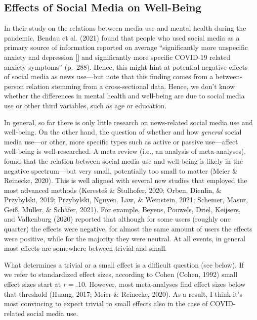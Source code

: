 \documentclass[
  english,
  man,floatsintext]{apa6}
\begin{document}
\hypertarget{effects-of-social-media-on-well-being}{%
\subsection{Effects of Social Media on Well-Being}\label{effects-of-social-media-on-well-being}}

In their study on the relations between media use and mental health during the pandemic, Bendau et al. (2021) found that people who used social media as a primary source of information reported on average ``significantly more unspecific anxiety and depression {[}{]} and significantly more specific COVID-19 related anxiety symptoms'' (p.~288).
Hence, this might hint at potential negative effects of social media as news use---but note that this finding comes from a between-person relation stemming from a cross-sectional data.
Hence, we don't know whether the differences in mental health and well-being are due to social media use or other third variables, such as age or education.

In general, so far there is only little research on news-related social media use and well-being.
On the other hand, the question of whether and how \emph{general} social media use---or other, more specific types such as active or passive use---affect well-being is well-researched.
A meta review (i.e., an analysis of meta-analyses), found that the relation between social media use and well-being is likely in the negative spectrum---but very small, potentially too small to matter (Meier \& Reinecke, 2020).
This is well aligned with several new studies that employed the most advanced methods (Keresteš \& Štulhofer, 2020; Orben, Dienlin, \& Przybylski, 2019; Przybylski, Nguyen, Law, \& Weinstein, 2021; Schemer, Masur, Geiß, Müller, \& Schäfer, 2021).
For example, Beyens, Pouwels, Driel, Keijsers, and Valkenburg (2020) reported that although for some users (roughly one quarter) the effects were negative, for almost the same amount of users the effects were positive, while for the majority they were neutral.
At all events, in general most effects are somewhere between trivial and small.

What determines a trivial or a small effect is a difficult question (see below).
If we refer to standardized effect sizes, according to Cohen (Cohen, 1992) small effect sizes start at \emph{r} = .10.
However, most meta-analyses find effect sizes below that threshold (Huang, 2017; Meier \& Reinecke, 2020).
As a result, I think it's most convincing to expect trivial to small effects also in the case of COVID-related social media use.
\end{document}
